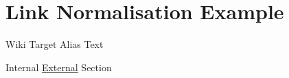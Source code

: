 \section{Link Normalisation Example}\label{link-normalisation-example}

Wiki Target Alias Text

Internal \href{https://example.com}{External} Section
